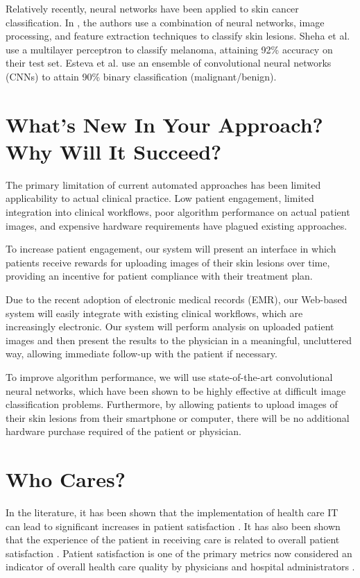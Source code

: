 \documentclass[a4paper,10pt]{article}
\begin{document}
Relatively recently, neural networks have been applied to skin cancer
classification. In \cite{Kreutz2001}, the authors use a combination of neural
networks, image processing, and feature extraction techniques to classify
skin lesions. Sheha et al. \cite{Sheha_automaticdetection} use a multilayer
perceptron to classify melanoma, attaining 92\% accuracy on their test set.
Esteva et al. \cite{esteva-skincancer-manuscript} use an ensemble of
convolutional neural networks (CNNs) to attain 90\% binary classification
(malignant/benign).

\section{What's New In Your Approach? Why Will It Succeed?}
The primary limitation of current automated approaches has been limited
applicability to actual clinical practice. Low patient engagement, limited
integration into clinical workflows, poor algorithm performance on actual
patient images, and expensive hardware requirements have plagued existing
approaches.

To increase patient engagement, our system will present an interface in which
patients receive rewards for uploading images of their skin lesions
over time, providing an incentive for patient compliance with their treatment
plan.

Due to the recent adoption of electronic medical records (EMR), our Web-based
system will easily integrate with existing clinical workflows, which are
increasingly electronic. Our system will perform analysis on uploaded patient
images and then present the results to the physician in a meaningful,
uncluttered way, allowing immediate follow-up with the patient if necessary.

To improve algorithm performance, we will use state-of-the-art convolutional
neural networks, which have been shown to be highly effective
\cite{krizhevsky2012imagenet} at difficult image classification problems.
Furthermore, by allowing patients to upload images of their skin lesions from
their smartphone or computer, there will be no additional hardware purchase
required of the patient or physician.

\section{Who Cares?}
In the literature, it has been shown that the implementation of health care
IT can lead to significant increases in patient satisfaction
\cite{roham2012predicting}. It has also been shown that the experience of the
patient in receiving care is related to overall patient
satisfaction \cite{bjertnaes2012overall}. Patient satisfaction is one of the
primary metrics now considered an indicator of overall health care quality by
physicians and hospital administrators \cite{fenton2012cost}.
\end{document}
